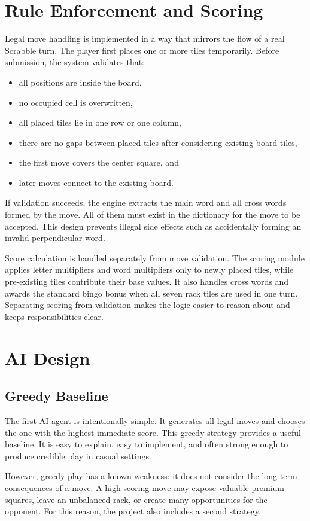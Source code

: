 \documentclass[conference]{IEEEtran}
\begin{document}
\section{Rule Enforcement and Scoring}
Legal move handling is implemented in a way that mirrors the flow of a real Scrabble turn. The player first places one or more tiles temporarily. Before submission, the system validates that:
\begin{itemize}
\item all positions are inside the board,
\item no occupied cell is overwritten,
\item all placed tiles lie in one row or one column,
\item there are no gaps between placed tiles after considering existing board tiles,
\item the first move covers the center square, and
\item later moves connect to the existing board.
\end{itemize}

If validation succeeds, the engine extracts the main word and all cross words formed by the move. All of them must exist in the dictionary for the move to be accepted. This design prevents illegal side effects such as accidentally forming an invalid perpendicular word.

Score calculation is handled separately from move validation. The scoring module applies letter multipliers and word multipliers only to newly placed tiles, while pre-existing tiles contribute their base values. It also handles cross words and awards the standard bingo bonus when all seven rack tiles are used in one turn. Separating scoring from validation makes the logic easier to reason about and keeps responsibilities clear.

\section{AI Design}
\subsection{Greedy Baseline}
The first AI agent is intentionally simple. It generates all legal moves and chooses the one with the highest immediate score. This greedy strategy provides a useful baseline. It is easy to explain, easy to implement, and often strong enough to produce credible play in casual settings.

However, greedy play has a known weakness: it does not consider the long-term consequences of a move. A high-scoring move may expose valuable premium squares, leave an unbalanced rack, or create many opportunities for the opponent. For this reason, the project also includes a second strategy.
\end{document}
